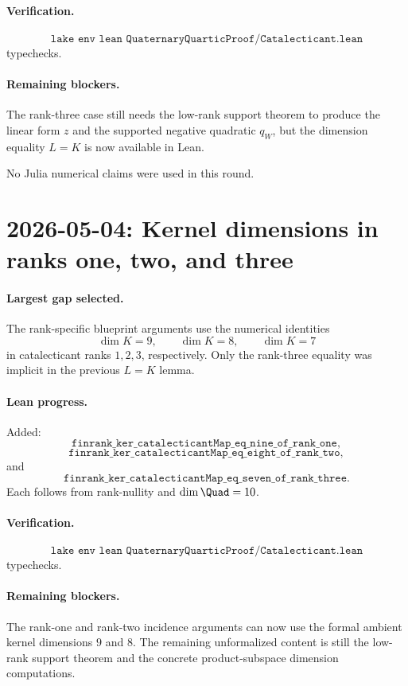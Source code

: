 \documentclass[11pt]{article}
\begin{document}
\paragraph{Verification.}
\[
\texttt{lake env lean QuaternaryQuarticProof/Catalecticant.lean}
\]
typechecks.

\paragraph{Remaining blockers.}
The rank-three case still needs the low-rank support theorem to produce the
linear form \(z\) and the supported negative quadratic \(q_W\), but the
dimension equality \(L=K\) is now available in Lean.

No Julia numerical claims were used in this round.

\section*{2026-05-04: Kernel dimensions in ranks one, two, and three}

\paragraph{Largest gap selected.}
The rank-specific blueprint arguments use the numerical identities
\[
\dim K=9,\qquad \dim K=8,\qquad \dim K=7
\]
in catalecticant ranks \(1,2,3\), respectively.  Only the rank-three equality
was implicit in the previous \(L=K\) lemma.

\paragraph{Lean progress.}
Added:
\[
\texttt{finrank\_ker\_catalecticantMap\_eq\_nine\_of\_rank\_one},
\]
\[
\texttt{finrank\_ker\_catalecticantMap\_eq\_eight\_of\_rank\_two},
\]
and
\[
\texttt{finrank\_ker\_catalecticantMap\_eq\_seven\_of\_rank\_three}.
\]
Each follows from rank-nullity and \(\dim\Quad=10\).

\paragraph{Verification.}
\[
\texttt{lake env lean QuaternaryQuarticProof/Catalecticant.lean}
\]
typechecks.

\paragraph{Remaining blockers.}
The rank-one and rank-two incidence arguments can now use the formal ambient
kernel dimensions \(9\) and \(8\).  The remaining unformalized content is
still the low-rank support theorem and the concrete product-subspace
dimension computations.
\end{document}
